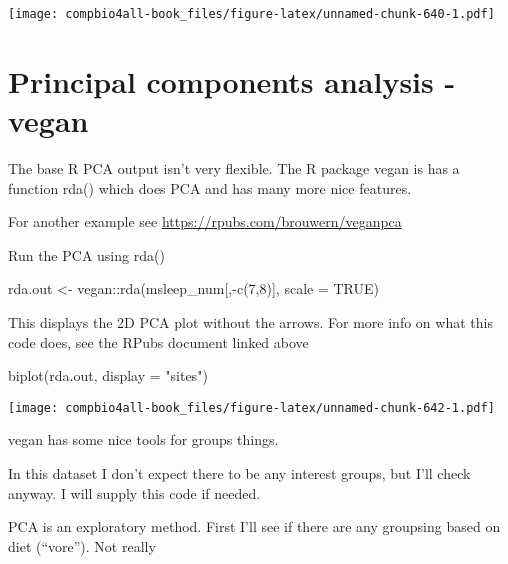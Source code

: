 \documentclass[
]{book}
\newenvironment{Shaded}{\begin{snugshade}}{\end{snugshade}}
\newcommand{\AttributeTok}[1]{\textcolor[rgb]{0.77,0.63,0.00}{#1}}
\newcommand{\ConstantTok}[1]{\textcolor[rgb]{0.00,0.00,0.00}{#1}}
\newcommand{\DecValTok}[1]{\textcolor[rgb]{0.00,0.00,0.81}{#1}}
\newcommand{\FunctionTok}[1]{\textcolor[rgb]{0.00,0.00,0.00}{#1}}
\newcommand{\NormalTok}[1]{#1}
\newcommand{\OtherTok}[1]{\textcolor[rgb]{0.56,0.35,0.01}{#1}}
\newcommand{\SpecialCharTok}[1]{\textcolor[rgb]{0.00,0.00,0.00}{#1}}
\newcommand{\StringTok}[1]{\textcolor[rgb]{0.31,0.60,0.02}{#1}}
\begin{document}
\texttt{[image: compbio4all-book\_files/figure-latex/unnamed-chunk-640-1.pdf]}

\hypertarget{principal-components-analysis---vegan}{%
\section{Principal components analysis - vegan}\label{principal-components-analysis---vegan}}

The base R PCA output isn't very flexible. The R package vegan is has a function rda() which does PCA and has many more nice features.

For another example see
\url{https://rpubs.com/brouwern/veganpca}

Run the PCA using rda()

\begin{Shaded}
\begin{Highlighting}[]
\NormalTok{rda.out }\OtherTok{\textless{}{-}}\NormalTok{ vegan}\SpecialCharTok{::}\FunctionTok{rda}\NormalTok{(msleep\_num[,}\SpecialCharTok{{-}}\FunctionTok{c}\NormalTok{(}\DecValTok{7}\NormalTok{,}\DecValTok{8}\NormalTok{)], }\AttributeTok{scale =} \ConstantTok{TRUE}\NormalTok{)}
\end{Highlighting}
\end{Shaded}

This displays the 2D PCA plot without the arrows. For more info on what this code does, see the RPubs document linked above

\begin{Shaded}
\begin{Highlighting}[]
\FunctionTok{biplot}\NormalTok{(rda.out, }\AttributeTok{display =} \StringTok{"sites"}\NormalTok{)}
\end{Highlighting}
\end{Shaded}

\texttt{[image: compbio4all-book\_files/figure-latex/unnamed-chunk-642-1.pdf]}

vegan has some nice tools for groups things.

In this dataset I don't expect there to be any interest groups, but I'll check anyway.
I will supply this code if needed.

PCA is an exploratory method. First I'll see if there are any groupsing based on diet (``vore''). Not really

\begin{Shaded}
\end{Shaded}
\end{document}
